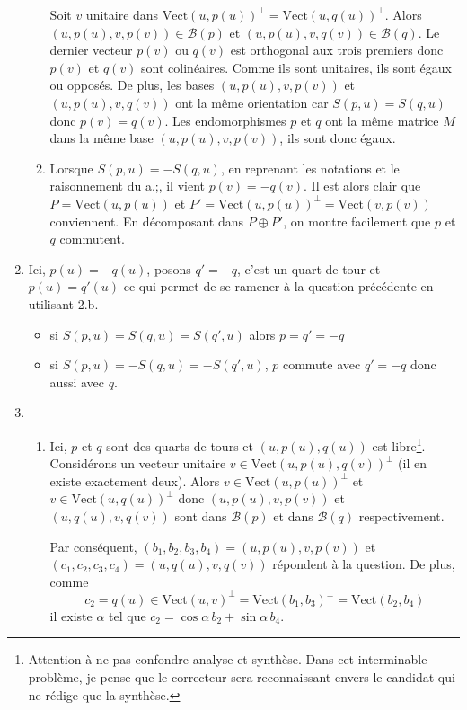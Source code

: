 \begin{enumerate}
\begin{enumerate}
Soit $v$ unitaire dans $ \mathrm{Vect}(u,p(u))^{\bot}=\mathrm{Vect}(u,q(u))^{\bot}$. Alors $(u,p(u),v,p(v))\in \mathcal{B}(p)$ et $(u,p(u),v,q(v))\in \mathcal{B} (q)$. Le dernier vecteur $p(v)$ ou $q(v)$ est orthogonal aux trois premiers donc $p(v)$ et $q(v)$ sont colinéaires. Comme ils sont unitaires, ils sont égaux ou opposés. De plus, les bases $(u,p(u),v,p(v))$ et $(u,p(u),v,q(v))$ ont la même orientation car $S(p,u)=S(q,u)$ donc $p(v)=q(v)$. Les endomorphismes $p$ et $q$ ont la même matrice $M$ dans la même base $(u,p(u),v,p(v))$, ils sont donc égaux.
\item Lorsque $S(p,u)=-S(q,u)$, en reprenant les notations et le raisonnement du a.;, il vient $p(v)=-q(v)$. Il est alors clair que 
$P=\mathrm{Vect}(u,p(u))$ et $P'=\mathrm{Vect}(u,p(u))^{\bot}=\mathrm{Vect}(v,p(v))$ conviennent. En décomposant dans $P\oplus P'$, on montre facilement que $p$ et $q$ commutent.
\end{enumerate}
\item Ici, $p(u)=-q(u)$, posons $q'=-q$, c'est un quart de tour et $p(u)=q'(u)$ ce qui permet de se ramener à la question précédente en utilisant 2.b.
\begin{itemize}
\item si $S(p,u)=S(q,u)= S(q',u)$ alors $p=q'=-q$
\item si $S(p,u)=-S(q,u) =-S(q',u)$, $p$ commute avec $q'=-q$ donc aussi avec $q$.
\end{itemize}
\item \begin{enumerate}
\item Ici, $p$ et $q$ sont des quarts de tours et $(u,p(u),q(u))$ est libre\footnote{Attention à ne pas confondre analyse et synthèse. Dans cet interminable problème, je pense que le correcteur sera reconnaissant envers le candidat qui ne rédige que la synthèse.}. Considérons un vecteur unitaire $v\in \mathrm{Vect}(u,p(u),q(v))^{\bot}$ (il en existe exactement deux). Alors $v\in \mathrm{Vect}(u,p(u))^{\bot}$ et $v\in\mathrm{Vect}(u,q(u))^{\bot}$ donc $(u,p(u),v,p(v))$ et $(u,q(u),v,q(v))$ sont dans $\mathcal{B}(p)$ et dans $\mathcal{B}(q)$ respectivement.

Par conséquent, $(b_{1},b_{2},b_{3},b_{4})=(u,p(u),v,p(v))$ et $(c_{1},c_{2},c_{3},c_{4})=(u,q(u),v,q(v))$ répondent à la question. De plus, comme 
\[c_{2}=q(u)\in \mathrm{Vect}(u,v)^{\bot}=\mathrm{Vect}(b_{1},b_{3})^{\bot}=\mathrm{Vect}(b_{2},b_{4})\]
il existe $\alpha$ tel que $c_{2}=\cos \alpha \,b_{2}+\sin \alpha \,b_{4}$. 


\end{enumerate}
\end{enumerate}
